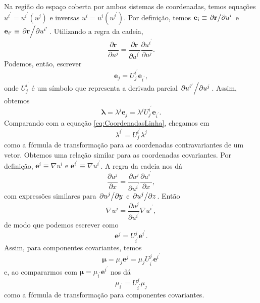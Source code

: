 Na região do espaço coberta por ambos sistemas de coordenadas, temos equações $u^{i^{\prime}}=u^{i^{\prime}}\left(u^{j}\right)$ e inversas $u^{i}=u^{i}\left(u^{j^\prime}\right)$. Por definição, temos $\mathbf{e}_i \equiv \pdv*{\mathbf{r}}{u^i}$ e $\mathbf{e}_{i^\prime} \equiv \pdv*{\mathbf{r}}{u^{i^\prime}}$. Utilizando a regra da cadeia,
\[
	\frac{\partial \mathbf{r}}{\partial u^{j}}=\frac{\partial \mathbf{r}}{\partial u^{i^{\prime}}} \frac{\partial u^{i^{\prime}}}{\partial u^{j}}.
\]
Podemos, então, escrever
\begin{equation}\label{eq:TransformadaContravarianteBase}
	\mathbf{e}_j = U^{i^\prime}_j \mathbf{e}_{i^\prime}, 
\end{equation}
onde $U^{i^\prime}_j $ é um símbolo que representa a derivada parcial $\pdv*{u^{i^\prime}}{u^j}$. Assim, obtemos
\[
	\boldsymbol{\lambda}=\lambda^{j} \mathbf{e}_{j}=\lambda^{j} U_{j}^{i^{\prime}} \mathbf{e}_{i^{\prime}}.
\]
Comparando com a equação \eqref{eq:CoordenadasLinha}, chegamos em
\begin{equation}\label{eq:TransformadaCoordenadasContravariante}
	\boxed{
		\lambda^{i^\prime} = U^{i^\prime}_j \lambda^j
	}
\end{equation}
como a fórmula de transformação para as coordenadas contravariantes de um vetor. Obtemos uma relação similar para as coordenadas covariantes. Por definição, $\mathbf{e}^{i} \equiv \nabla u^{i} \text { e } \mathbf{e}^{i^{\prime}} \equiv \nabla u^{i^{\prime}}$. A regra da cadeia nos dá
\[
	\frac{\partial u^{j}}{\partial x}=\frac{\partial u^{j}}{\partial u^{i^{\prime}}} \frac{\partial u^{i^{\prime}}}{\partial x},
\]
com expressões similares para $\pdv*{u^j}{y}$ e $\pdv*{u^j}{z}$. Então
\[
	\nabla u^{j}=\frac{\partial u^{j}}{\partial u^{i^{\prime}}} \nabla u^{i^{\prime}},
\]
de modo que podemos escrever como
\begin{equation}\label{eq:TransformadaCovarianteBase}
	\mathbf{e}^{j} = U^{j}_{i^\prime} \mathbf{e}^{i^\prime}.
\end{equation}
Assim, para componentes covariantes, temos
\[
	\boldsymbol{\mu}=\mu_{j} \mathbf{e}^{j}=\mu_{j} U_{i^{\prime}}^{j} \mathbf{e}^{i^{\prime}}
\]
e, ao compararmos com $\mathbf{\mu}=\mu_{i^\prime}\mathbf{e}^{i^\prime}$ nos dá
\begin{equation}\label{eq:TransformadaCoordenadasCovariante}
	\boxed{
		\mu_{i^\prime} = U^{j}_{i^\prime} \mu_j
	}
\end{equation}
como a fórmula de transformação para componentes covariantes.

